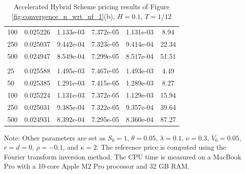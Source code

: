\documentclass[11pt]{article}%
\theoremstyle{definition}
\begin{document}
\begin{table}[tph]
\begin{center}
\begin{tabular}{lccccc}
     100 & 0.025226 & 1.133e-03 & 7.372e-05 & 1.131e-03 & 8.94 \\
     250 & 0.025037 & 9.442e-04 & 7.323e-05 & 9.414e-04 & 22.34 \\
     500 & 0.024947 & 8.549e-04 & 7.299e-05 & 8.517e-04 & 51.51 \\
    \addlinespace
    \multicolumn{6}{l}{$n_f = 800$, $\text{Reference Price} = 0.024095$} \\
      25 & 0.025588 & 1.495e-03 & 7.467e-05 & 1.493e-03 & 4.49 \\
      50 & 0.025385 & 1.291e-03 & 7.415e-05 & 1.289e-03 & 8.27 \\
     100 & 0.025224 & 1.131e-03 & 7.372e-05 & 1.129e-03 & 15.94 \\
     250 & 0.025031 & 9.385e-04 & 7.322e-05 & 9.357e-04 & 39.64 \\
     500 & 0.024931 & 8.392e-04 & 7.295e-05 & 8.360e-04 & 87.27 \\
    \hline
  \end{tabular}
  \caption{Accelerated Hybrid Scheme pricing results of Figure \ref{fig:convergence_n_wrt_nf_1}(b), $H=0.1$, $T=1/12$}
  \label{tab:sim_results_groupByNf_1Month_point1H}
\end{center}
    \begin{small}%
    Note: Other parameters are set as \(S_0 = 1\), \(\theta = 0.05\), \(\lambda = 0.1\), \(\nu = 0.3\), \(V_0 = 0.05\), \(r=d=0\), \(\rho=-0.1\), and \(\kappa = 2\). The reference price is computed using the Fourier transform inversion method. The CPU time is measured on a MacBook Pro with a 10-core Apple M2 Pro processor and 32 GB RAM.
    \end{small}
\end{table}
\end{document}
